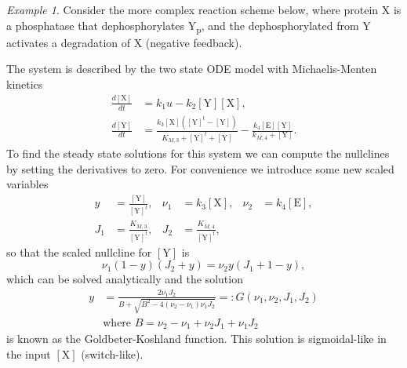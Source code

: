 \documentclass[a4paper]{article}
\newcommand{\co}[1]{[\text{#1}]} %
\theoremstyle{plain}
\theoremstyle{definition}
\theoremstyle{remark}
\newtheorem*{example}{Example}
\begin{document}
\begin{example}
  Consider the more complex reaction scheme below, where protein X is a
  phosphatase that dephosphorylates Y\textsubscript{p}, and the
  dephosphorylated from Y activates a degradation of X (negative feedback).
  \begin{center}
  \end{center}
  The system is described by the two state ODE model with Michaelis-Menten
  kinetics
  \begin{align*}
    \frac{d\co{X}}{dt} &= k_1 u - k_2 \co{Y} \co{X}, \\
    \frac{d\co{Y}}{dt} &= \frac{
      k_3\co{X}(\co{Y}^t - \co{Y})
    }{
      K_{M,3} + \co{Y}^t + \co{Y}
    }
    - \frac{
      k_4 \co{E} \co{Y}
    }{
      k_{M,4} + \co{Y}
    }.
  \end{align*}
  To find the steady state solutions for this system we can compute the
  nullclines by setting the derivatives to zero. For convenience we introduce
  some new scaled variables
  \begin{align*}
    y &= \frac{\co{Y}}{\co{Y}^t},
      & \nu_1 &= k_3 \co{X},
      & \nu_2 &= k_4 \co{E}, \\
    J_1 &= \frac{K_{M,3}}{\co{Y}^t},
      & J_2 &= \frac{K_{M,4}}{\co{Y}^t},
  \end{align*}
  so that the scaled nullcline for $\co{Y}$ is
  \[
    \nu_1 (1 - y) (J_2 + y) = \nu_2 y (J_1 + 1 - y),
  \]
  which can be solved analytically and the solution
  \begin{align*}
    y &= \frac{
      2\nu_1 J_2
    }{
      B + \sqrt{B^2 - 4 (\nu_2 - \nu_1) \nu_1 J_2}
    } =: G(\nu_1, \nu_2, J_1, J_2) \\
    &\text{where } B = \nu_2 - \nu_1 + \nu_2 J_1 + \nu_1 J_2
  \end{align*}
  is known as the Goldbeter-Koshland function. This solution is sigmoidal-like
  in the input $\co{X}$ (switch-like).
\end{example}
\end{document}
